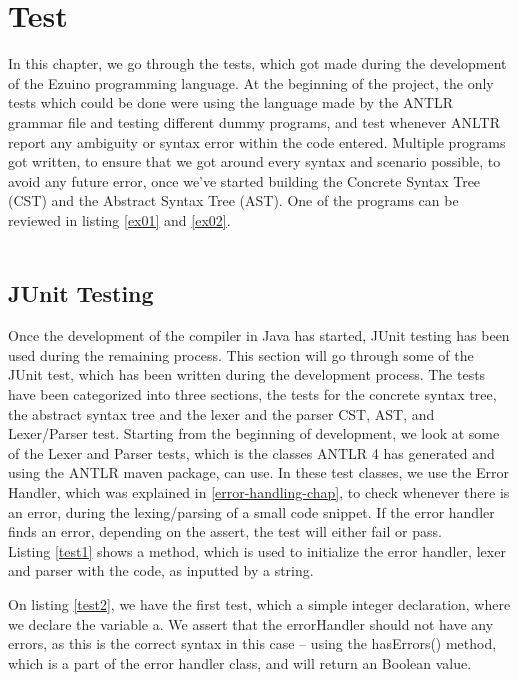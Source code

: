 \chapter{Test}
In this chapter, we go through the tests, which got made during the development of the Ezuino programming language. At the beginning of the project, the only tests which could be done were using the language made by the ANTLR grammar file and testing different dummy programs, and test whenever ANLTR report any ambiguity or syntax error within the code entered. Multiple programs got written, to ensure that we got around every syntax and scenario possible, to avoid any future error, once we’ve started building the Concrete Syntax Tree (CST) and the Abstract Syntax Tree (AST).  One of the programs can be reviewed in listing \ref{ex01} and \ref{ex02}.
\\\\
\section{JUnit Testing}
Once the development of the compiler in Java has started, JUnit testing has been used during the remaining process. This section will go through some of the JUnit test, which has been written during the development process. The tests have been categorized into three sections, the tests for the concrete syntax tree, the abstract syntax tree and the lexer and the parser CST, AST, and Lexer/Parser test.
Starting from the beginning of development, we look at some of the Lexer and Parser tests, which is the classes ANTLR 4 has generated and using the ANTLR maven package, can use. In these test classes, we use the Error Handler, which was explained in \ref{error-handling-chap}, to check whenever there is an error, during the lexing/parsing of a small code snippet. If the error handler finds an error, depending on the assert, the test will either fail or pass.\\
Listing \ref{test1} shows a method, which is used to initialize the error handler, lexer and parser with the code, as inputted by a string.

\noindent\newline

On listing \ref{test2}, we have the first test, which a simple integer declaration, where we declare the variable a. We assert that the errorHandler should not have any errors, as this is the correct syntax in this case – using the hasErrors() method, which is a part of the error handler class, and will return an Boolean value.

\noindent\newline


